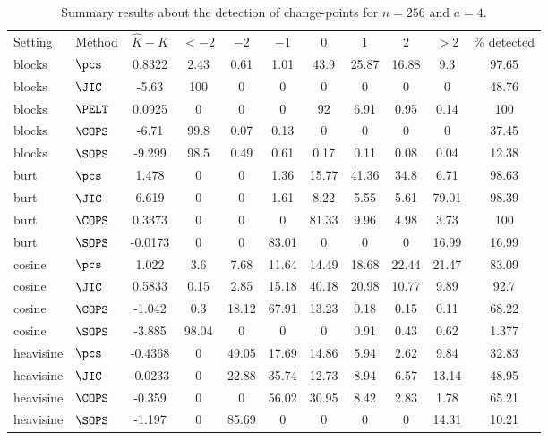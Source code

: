 \begin{table}[ht]
\centering
\begin{tabular}{llccccccccc}
 Setting & Method & $\hat{K} - K$ & $< -2$ & $-2$ & $-1$ & $0$ & $1$ & $2$ & $> 2$ & \% detected \\ 
 blocks & $\pcs$ & 0.8322 &  2.43 &  0.61 &  1.01 &  43.9 & 25.87 & 16.88 &   9.3 & 97.65 \\ 
  blocks & $\JIC$ & -5.63 &   100 &     0 &     0 &     0 &     0 &     0 &     0 & 48.76 \\ 
  blocks & $\PELT$ & 0.0925 &     0 &     0 &     0 &    92 &  6.91 &  0.95 &  0.14 &   100 \\ 
  blocks & $\COPS$ & -6.71 &  99.8 &  0.07 &  0.13 &     0 &     0 &     0 &     0 & 37.45 \\ 
  blocks & $\SOPS$ & -9.299 &  98.5 &  0.49 &  0.61 &  0.17 &  0.11 &  0.08 &  0.04 & 12.38 \\ 
   \hline
burt & $\pcs$ & 1.478 &     0 &     0 &  1.36 & 15.77 & 41.36 &  34.8 &  6.71 & 98.63 \\ 
  burt & $\JIC$ & 6.619 &     0 &     0 &  1.61 &  8.22 &  5.55 &  5.61 & 79.01 & 98.39 \\ 
  burt & $\COPS$ & 0.3373 &     0 &     0 &     0 & 81.33 &  9.96 &  4.98 &  3.73 &   100 \\ 
  burt & $\SOPS$ & -0.0173 &     0 &     0 & 83.01 &     0 &     0 &     0 & 16.99 & 16.99 \\ 
  cosine & $\pcs$ & 1.022 &   3.6 &  7.68 & 11.64 & 14.49 & 18.68 & 22.44 & 21.47 & 83.09 \\ 
   \hline
cosine & $\JIC$ & 0.5833 &  0.15 &  2.85 & 15.18 & 40.18 & 20.98 & 10.77 &  9.89 &  92.7 \\ 
  cosine & $\COPS$ & -1.042 &   0.3 & 18.12 & 67.91 & 13.23 &  0.18 &  0.15 &  0.11 & 68.22 \\ 
  cosine & $\SOPS$ & -3.885 & 98.04 &     0 &     0 &     0 &  0.91 &  0.43 &  0.62 & 1.377 \\ 
  heavisine & $\pcs$ & -0.4368 &     0 & 49.05 & 17.69 & 14.86 &  5.94 &  2.62 &  9.84 & 32.83 \\ 
  heavisine & $\JIC$ & -0.0233 &     0 & 22.88 & 35.74 & 12.73 &  8.94 &  6.57 & 13.14 & 48.95 \\ 
   \hline
heavisine & $\COPS$ & -0.359 &     0 &     0 & 56.02 & 30.95 &  8.42 &  2.83 &  1.78 & 65.21 \\ 
  heavisine & $\SOPS$ & -1.197 &     0 & 85.69 &     0 &     0 &     0 &     0 & 14.31 & 10.21 \\ 
  \end{tabular}
\caption{Summary results about the detection of change-points for $n = 256$ and $a = 4$.} 
\label{tab:CPn256a4}
\end{table}
